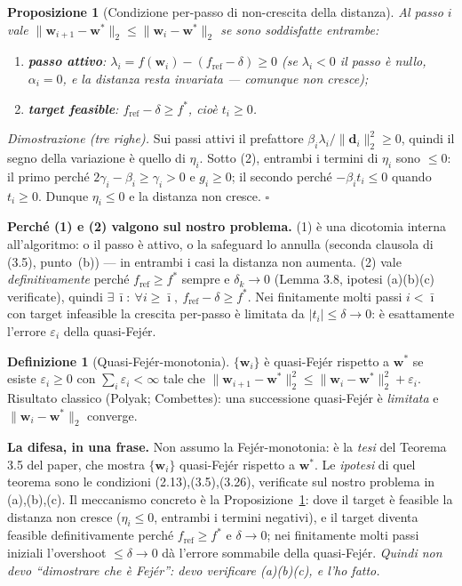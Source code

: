 \documentclass[11pt,a4paper]{article}
\newtheorem{proposition}{Proposizione}
\theoremstyle{definition}
\newtheorem{definition}{Definizione}
\newcommand{\w}{\bm{w}}
\newcommand{\dvec}{\bm{d}}
\newcommand{\wstar}{\w^{*}}
\newcommand{\fstar}{f^{*}}
\newcommand{\fref}{f_{\mathrm{ref}}}
\newcommand{\eps}{\varepsilon}
\newcommand{\norm}[1]{\lVert #1\rVert}
\begin{document}
\begin{proposition}[Condizione per-passo di non-crescita della distanza]
\label{prop:fejer-cond}
Al passo $i$ vale $\norm{\w_{i+1}-\wstar}_2\le\norm{\w_i-\wstar}_2$ se sono soddisfatte
\emph{entrambe}:
\begin{enumerate}[label=\textnormal{(\arabic*)},leftmargin=2.2em]
\item \textbf{passo attivo}: $\lambda_i=f(\w_i)-(\fref-\delta)\ge0$ \;(se $\lambda_i<0$ il passo
è nullo, $\alpha_i=0$, e la distanza resta invariata --- comunque non cresce);
\item \textbf{target feasible}: $\fref-\delta\ge\fstar$, cioè $t_i\ge0$.
\end{enumerate}
\end{proposition}

\emph{Dimostrazione (tre righe).} Sui passi attivi il prefattore
$\beta_i\lambda_i/\norm{\dvec_i}_2^2\ge0$, quindi il segno della variazione è quello di
$\eta_i$. Sotto (2), entrambi i termini di $\eta_i$ sono $\le0$: il primo perché
$2\gamma_i-\beta_i\ge\gamma_i>0$ e $g_i\ge0$; il secondo perché $-\beta_i t_i\le0$ quando
$t_i\ge0$. Dunque $\eta_i\le0$ e la distanza non cresce. \hfill$\square$

\textbf{Perché (1) e (2) valgono sul nostro problema.} (1) è una dicotomia interna
all'algoritmo: o il passo è attivo, o la safeguard lo annulla (seconda clausola di (3.5),
punto~(b)) --- in entrambi i casi la distanza non aumenta. (2) vale \emph{definitivamente}
perché $\fref\ge\fstar$ sempre e $\delta_k\to0$ (Lemma 3.8, ipotesi (a)(b)(c) verificate),
quindi $\exists\,\bar\imath:\ \forall i\ge\bar\imath,\ \fref-\delta\ge\fstar$. Nei finitamente
molti passi $i<\bar\imath$ con target infeasible la crescita per-passo è limitata da
$|t_i|\le\delta\to0$: è esattamente l'errore $\eps_i$ della quasi-Fej\'er.

\begin{definition}[Quasi-Fej\'er-monotonia]
\label{def:quasi-fejer}
$\{\w_i\}$ è quasi-Fej\'er rispetto a $\wstar$ se esiste $\eps_i\ge0$ con
$\sum_i\eps_i<\infty$ tale che
$\norm{\w_{i+1}-\wstar}_2^2\le\norm{\w_i-\wstar}_2^2+\eps_i$. Risultato classico (Polyak;
Combettes): una successione quasi-Fej\'er è \emph{limitata} e $\norm{\w_i-\wstar}_2$ converge.
\end{definition}

\begin{keybox}
\textbf{La difesa, in una frase.} Non assumo la Fej\'er-monotonia: è la \emph{tesi} del Teorema
3.5 del paper, che mostra $\{\w_i\}$ quasi-Fej\'er rispetto a $\wstar$. Le \emph{ipotesi} di quel
teorema sono le condizioni (2.13),(3.5),(3.26), verificate sul nostro problema in (a),(b),(c).
Il meccanismo concreto è la Proposizione~\ref{prop:fejer-cond}: dove il target è feasible la
distanza non cresce ($\eta_i\le0$, entrambi i termini negativi), e il target diventa feasible
definitivamente perché $\fref\ge\fstar$ e $\delta\to0$; nei finitamente molti passi iniziali
l'overshoot $\le\delta\to0$ dà l'errore sommabile della quasi-Fej\'er. \emph{Quindi non devo
``dimostrare che è Fej\'er'': devo verificare (a)(b)(c), e l'ho fatto.}
\end{keybox}
\end{document}
